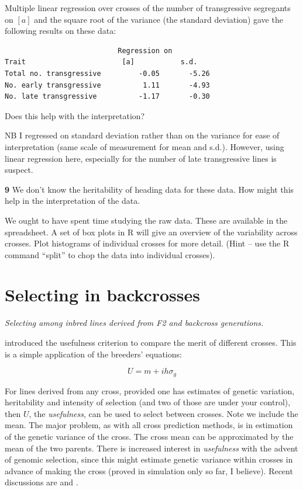 \documentclass[
]{book}
\makeatletter
\newenvironment{kframe}{%
\medskip{}
\setlength{\fboxsep}{.8em}
 \def\at@end@of@kframe{}%
 \ifinner\ifhmode%
  \def\at@end@of@kframe{\end{minipage}}%
  \begin{minipage}{\columnwidth}%
 \fi\fi%
 \def\FrameCommand##1{\hskip\@totalleftmargin \hskip-\fboxsep
 \colorbox{shadecolor}{##1}\hskip-\fboxsep
     \hskip-\linewidth \hskip-\@totalleftmargin \hskip\columnwidth}%
 \MakeFramed {\advance\hsize-\width
   \@totalleftmargin\z@ \linewidth\hsize
   \@setminipage}}%
 {\par\unskip\endMakeFramed%
 \at@end@of@kframe}
\newenvironment{rmdblock}[1]
  {
  \begin{itemize}
  \renewcommand{\labelitemi}{
    \raisebox{-.7\height}[0pt][0pt]{
      {\setkeys{Gin}{width=3em,keepaspectratio}\texttt{[image: images/\#1]}}
    }
  }
  \setlength{\fboxsep}{1em}
  \begin{kframe}
  \item
  }
  {
  \end{kframe}
  \end{itemize}
  }
\newenvironment{rmdquiz}
  {\begin{rmdblock}{quiz}}
  {\end{rmdblock}}
\makeatother
\begin{document}
Multiple linear regression over crosses of the number of transgressive segregants on \([a]\) and the square root of the variance (the standard deviation) gave the following results on these data:

\begin{verbatim}
                           Regression on
Trait                       [a]           s.d.
Total no. transgressive         -0.05       -5.26
No. early transgressive          1.11       -4.93
No. late transgressive          -1.17       -0.30
\end{verbatim}

Does this help with the interpretation?

NB I regressed on standard deviation rather than on the variance for ease of interpretation (same scale of measurement for mean and s.d.). However, using linear regression here, especially for the number of late transgressive lines is suspect.

\begin{rmdquiz}
\textbf{9}
We don't know the heritability of heading data for these data. How might this help in the interpretation of the data.
\end{rmdquiz}

We ought to have spent time studying the raw data. These are available in the spreadsheet. A set of box plots in R will give an overview of the variability across crosses. Plot histograms of individual crosses for more detail. (Hint -- use the R command ``split'' to chop the data into individual crosses).

\hypertarget{selecting-in-backcrosses}{%
\section{Selecting in backcrosses}\label{selecting-in-backcrosses}}

\emph{Selecting among inbred lines derived from F2 and backcross generations.}

\citet{Schnell_1975} introduced the usefulness criterion to compare the merit of different crosses. This is a simple application of the breeders' equations:

\[U  = m + ihσ_{g}\]

For lines derived from any cross, provided one has estimates of genetic variation, heritability and intensity of selection (and two of those are under your control), then \(U\), the \emph{usefulness}, can be used to select between crosses. Note we include the mean. The major problem, as with all cross prediction methods, is in estimation of the genetic variance of the cross. The cross mean can be approximated by the mean of the two parents. There is increased interest in \emph{usefulness} with the advent of genomic selection, since this might estimate genetic variance within crosses in advance of making the cross (proved in simulation only so far, I believe). Recent discussions are \citet{bernardo_genomewide_2014} and \citet{allier_usefulness_2019}.
\end{document}
